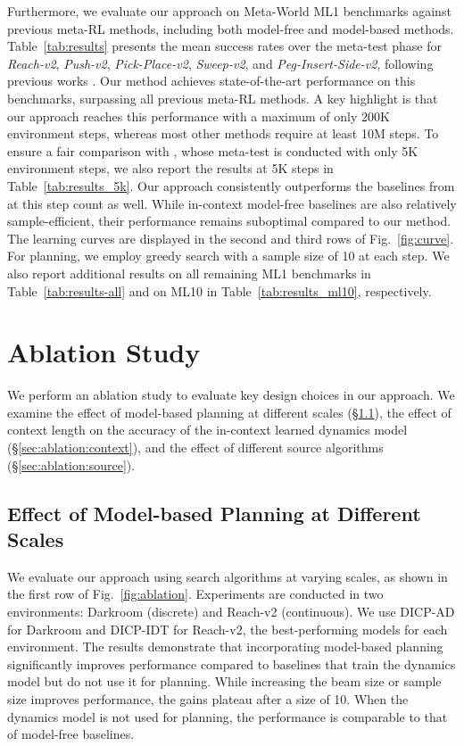 \documentclass{article}
\begin{document}
Furthermore, we evaluate our approach on Meta-World ML1 benchmarks against previous meta-RL methods, including both model-free and model-based methods.
Table~\ref{tab:results} presents the mean success rates over the meta-test phase for \emph{Reach-v2}, \emph{Push-v2}, \emph{Pick-Place-v2}, \emph{Sweep-v2}, and \emph{Peg-Insert-Side-v2}, following previous works \citep{MW, ProcGenMuZero, MoSS, IDAQ}.
Our method achieves state-of-the-art performance on this benchmarks, surpassing all previous meta-RL methods.
A key highlight is that our approach reaches this performance with a maximum of only 200K environment steps, whereas most other methods require at least 10M steps.
To ensure a fair comparison with \citet{IDAQ}, whose meta-test is conducted with only 5K environment steps, we also report the results at 5K steps in Table~\ref{tab:results_5k}.
Our approach consistently outperforms the baselines from \citet{IDAQ} at this step count as well.
While in-context model-free baselines \citep{AD, IDT} are also relatively sample-efficient, their performance remains suboptimal compared to our method.
The learning curves are displayed in the second and third rows of Fig.~\ref{fig:curve}.
For planning, we employ greedy search with a sample size of 10 at each step.
We also report additional results on all remaining ML1 benchmarks in Table~\ref{tab:results-all} and on ML10 in Table~\ref{tab:results_ml10}, respectively.


\section{Ablation Study}

We perform an ablation study to evaluate key design choices in our approach.
We examine the effect of model-based planning at different scales (\S\ref{sec:ablation:search}), the effect of context length on the accuracy of the in-context learned dynamics model (\S\ref{sec:ablation:context}), and the effect of different source algorithms (\S\ref{sec:ablation:source}).


\subsection{Effect of Model-based Planning at Different Scales}
\label{sec:ablation:search}

We evaluate our approach using search algorithms at varying scales, as shown in the first row of Fig.~\ref{fig:ablation}.
Experiments are conducted in two environments: Darkroom (discrete) and Reach-v2 (continuous).
We use DICP-AD for Darkroom and DICP-IDT for Reach-v2, the best-performing models for each environment.
The results demonstrate that incorporating model-based planning significantly improves performance compared to baselines that train the dynamics model but do not use it for planning.
While increasing the beam size or sample size improves performance, the gains plateau after a size of 10.
When the dynamics model is not used for planning, the performance is comparable to that of model-free baselines.
\end{document}

